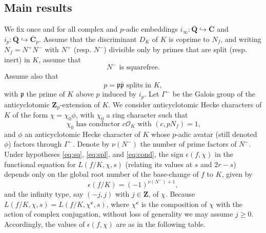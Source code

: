 \documentclass[10pt,letterpaper]{amsart}
\theoremstyle{plain}
\theoremstyle{definition}
\theoremstyle{definition}
\theoremstyle{plain}
\theoremstyle{plain}
\theoremstyle{plain}
\theoremstyle{remark}
\numberwithin{equation}{section}
\newcommand{\cc}{\mathbf{c}}
\newcommand{\pp}{\mathfrak{p}}
\newcommand{\ppbar}{\bar{\mathfrak{p}}}
\def\cO{\mathcal O}
\newcommand{\Q}{\mathbf{Q}}
\newcommand{\Z}{\mathbf{Z}}
\begin{document}
{%
%
%


\subsection{Main results} 

We fix once and for all complex and $p$-adic embeddings  $i_\infty:\overline{\Q}\hookrightarrow\overline{\mathbf{C}}$ and $i_p:\overline{\Q}\hookrightarrow\overline{\mathbf{C}}_p$. Assume that the discriminant $D_K$ of $K$ is coprime to $N_f$, and writing  $N_f=N^+N^-$ with $N^+$ (resp. $N^-$) divisible only by primes that are split (resp. inert) in $K$, assume that 
\begin{equation}\label{eq:sq}
\textrm{$N^-$ is squarefree.} \tag{sq}
\end{equation} 
Assume also that 
\begin{equation}\label{eq:spl}
\textrm{$p=\pp\ppbar$ splits in $K$},\tag{spl}
\end{equation}
with $\pp$ the prime of $K$ above $p$ induced by $i_p$. Let $\Gamma^-$ be the Galois group of the anticyclotomic $\Z_p$-extension of $K$. We consider anticyclotomic Hecke characters of $K$ of the form $\chi=\chi_0\phi$, with $\chi_0$ a ring character such that
\begin{equation}\label{eq:cond}
\textrm{$\chi_0$ has conductor $c\cO_K$ with $(c,pN_f)=1$,} \tag{cond}
\end{equation}
and $\phi$ an anticyclotomic Hecke character of $K$ whose $p$-adic avatar (still denoted $\phi$) factors through $\Gamma^-$. Denote by $\nu(N^-)$ the number of prime factors of $N^-$. 
Under hypotheses \eqref{eq:sq}, \eqref{eq:spl}, and \eqref{eq:cond},  the sign $\epsilon(f,\chi)$ in the functional equation for $L(f/K,\chi,s)$ (relating its values at $s$ and $2r-s$) depends only on the global root number of the base-change of $f$ to $K$, given by
\[
\epsilon(f/K)=(-1)^{\nu(N^-)+1},
\]
and the infinity type, say $(-j,j)$ with $j\in\Z$, of $\chi$. Because  $L(f/K,\chi,s)=L(f/K,\chi^\cc,s)$, where $\chi^\cc$ is the composition of $\chi$ with the action of complex conjugation, without loss of generality we may assume $j\geq 0$. Accordingly, the values of $\epsilon(f,\chi)$ are as in the following table. 

}
\end{document}
